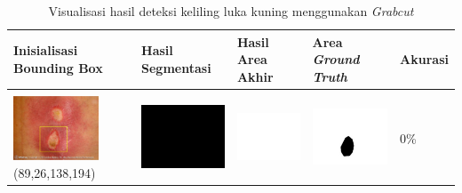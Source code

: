 \begin{table}[H]
	\centering
	\caption{Visualisasi hasil deteksi keliling luka kuning menggunakan \emph{Grabcut}}
	\label{tabel_hasil_7}
	\begin{tabular}{|m{1.0in}|m{1.0in}|m{1.0in}|m{1.0in}|m{0.6in}|}
		\hline
		\textbf{Inisialisasi Bounding Box} & \textbf{Hasil Segmentasi} & \textbf{Hasil Area Akhir} & \textbf{Area \emph{Ground Truth}} & \textbf{Akurasi} \\
		\hline
		
		&  &  & \\
		\includegraphics[width=1.0in]{gambar/hasil_segmentasi/luka_kuning/image_25_rect.jpg} {\centering\fontsize{10}{10}\selectfont(89,26,138,194)}&
		\includegraphics[width=1.0in]{gambar/hasil_segmentasi/luka_kuning/result_25.jpg}&
		\includegraphics[width=1.0in]{gambar/hasil_segmentasi/luka_kuning/mask_r_25.jpg}&
		\includegraphics[width=1.0in]{gambar/hasil_segmentasi/luka_kuning/25_r.jpg}&
		0\% \\
		\hline


\end{tabular}
\end{table}
